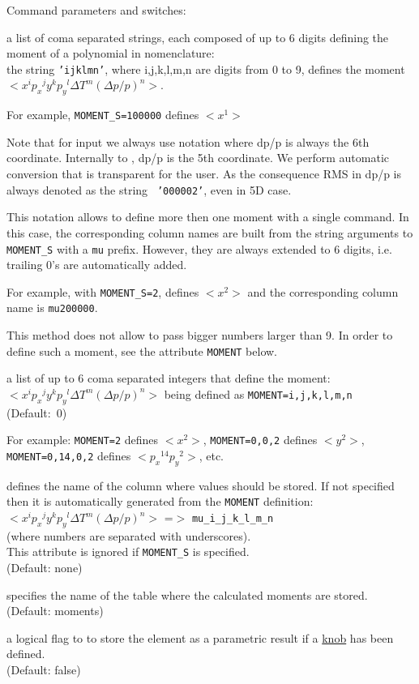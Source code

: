 Command parameters and switches:
\begin{madlist}
   a list of coma separated strings, each composed of
  up to 6 digits defining the moment of a polynomial in \ptc
  nomenclature: \\ the string {\tt 'ijklmn'}, where i,j,k,l,m,n are digits
  from 0 to 9, defines the moment $<x^i {p_x}^j y^k {p_y}^l \Delta T^m
  (\Delta p/p)^n>$.
  
  For example, {\tt MOMENT\_S=100000} defines $<x^1>$ 
  
  Note that for input we always use \madx notation where dp/p is always
  the 6th coordinate. Internally to \ptc, dp/p is the 5th coordinate. We
  perform automatic conversion that is transparent for the user. As the
  consequence RMS in dp/p is always denoted as the string {\tt
    '000002'}, even in 5D case.     
  
  This notation allows to define more then one moment with a single
  command. In this case, the corresponding column names are built from
  the string arguments to {\tt MOMENT\_S} with a {\tt mu} prefix. 
  However, they are always extended to 6 digits, i.e. trailing 0's are
  automatically added.

  For example, with {\tt MOMENT\_S=2}, defines  $<x^2>$ and the
  corresponding column name is {\tt mu200000}.
  
  This method does not allow to pass bigger numbers larger than 9. In
  order to define such a moment, see the attribute {\tt MOMENT} below.    
  
   a list of up to 6 coma separated integers that define
  the moment: \\ 
  $<x^i {p_x}^j y^k {p_y}^l \Delta T^m (\Delta p/p)^n>$ being
  defined as {\tt MOMENT=i,j,k,l,m,n}\\
  (Default:~0)
  
  For example: {\tt MOMENT=2} defines $< x^2 >$, {\tt MOMENT=0,0,2}
  defines  $< y^2 >$, {\tt MOMENT=0,14,0,2} defines $<{p_x}^{14} {p_y}^2>$, 
  etc. 
  
   defines the name of the column where values should be
  stored. If not specified then it is automatically generated from
  the {\tt MOMENT} definition:\\ 
  $< x^i {p_x}^j y^k {p_y}^l \Delta T^m (\Delta p/p)^n>$ =$>$ {\tt mu\_i\_j\_k\_l\_m\_n} \\
  (where numbers are separated with underscores). \\
  This attribute is ignored if {\tt MOMENT\_S} is specified. \\
  (Default: none)

   specifies the name of the table where the calculated
  moments are stored. \\
  (Default: moments)

   a logical flag to to store the element as a
  parametric result if a \hyperref[sec:ptc_knob]{knob} has been
  defined. \\
  (Default: false)
\end{madlist} 


